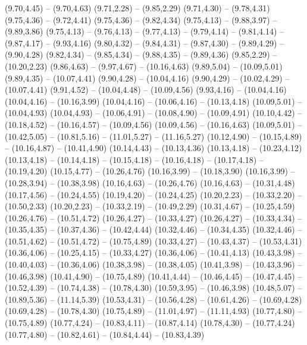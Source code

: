 {  (9.70,4.45) -- (9.70,4.63)
  (9.71,2.28) -- (9.85,2.29)
  (9.71,4.30) -- (9.78,4.31)
  (9.75,4.36) -- (9.72,4.41)
  (9.75,4.36) -- (9.82,4.34)
  (9.75,4.13) -- (9.88,3.97) -- (9.89,3.86)
  (9.75,4.13) -- (9.76,4.13) -- (9.77,4.13) -- (9.79,4.14) -- (9.81,4.14) -- (9.87,4.17) -- (9.93,4.16)
  (9.80,4.32) -- (9.84,4.31) -- (9.87,4.30) -- (9.89,4.29) -- (9.90,4.28)
  (9.82,4.34) -- (9.85,4.34) -- (9.88,4.35) -- (9.89,4.36)
  (9.85,2.29) -- (10.20,2.23)
  (9.86,4.63) -- (9.97,4.67) -- (10.16,4.63)
  (9.89,5.04) -- (10.09,5.01)
  (9.89,4.35) -- (10.07,4.41)
  (9.90,4.28) -- (10.04,4.16)
  (9.90,4.29) -- (10.02,4.29) -- (10.07,4.41)
  (9.91,4.52) -- (10.04,4.48) -- (10.09,4.56)
  (9.93,4.16) -- (10.04,4.16)
  (10.04,4.16) -- (10.16,3.99)
  (10.04,4.16) -- (10.06,4.16) -- (10.13,4.18)
  (10.09,5.01) -- (10.04,4.93)
  (10.04,4.93) -- (10.06,4.91) -- (10.08,4.90) -- (10.09,4.91)
  (10.10,4.42) -- (10.18,4.52) -- (10.16,4.57) -- (10.09,4.56)
  (10.09,4.56) -- (10.16,4.63)
  (10.09,5.01) -- (10.42,5.05) -- (10.81,5.16) -- (11.01,5.27) -- (11.16,5.27)
  (10.12,4.90) -- (10.15,4.89) -- (10.16,4.87) -- (10.41,4.90)
  (10.14,4.43) -- (10.13,4.36)
  (10.13,4.18) -- (10.23,4.12)
  (10.13,4.18) -- (10.14,4.18) -- (10.15,4.18) -- (10.16,4.18) -- (10.17,4.18) -- (10.19,4.20)
  (10.15,4.77) -- (10.26,4.76)
  (10.16,3.99) -- (10.18,3.90)
  (10.16,3.99) -- (10.28,3.94) -- (10.38,3.98)
  (10.16,4.63) -- (10.26,4.76)
  (10.16,4.63) -- (10.31,4.48)
  (10.17,4.56) -- (10.24,4.55)
  (10.19,4.20) -- (10.24,4.25)
  (10.20,2.23) -- (10.33,2.20) -- (10.50,2.33)
  (10.20,2.23) -- (10.33,2.19) -- (10.49,2.29)
  (10.31,4.67) -- (10.25,4.59)
  (10.26,4.76) -- (10.51,4.72)
  (10.26,4.27) -- (10.33,4.27)
  (10.26,4.27) -- (10.33,4.34) -- (10.35,4.35) -- (10.37,4.36) -- (10.42,4.44)
  (10.32,4.46) -- (10.34,4.35)
  (10.32,4.46) -- (10.51,4.62) -- (10.51,4.72) -- (10.75,4.89)
  (10.33,4.27) -- (10.43,4.37) -- (10.53,4.31)
  (10.36,4.06) -- (10.25,4.15) -- (10.33,4.27)
  (10.36,4.06) -- (10.41,4.13)
  (10.43,3.98) -- (10.40,4.03) -- (10.36,4.06)
  (10.38,3.98) -- (10.38,4.05)
  (10.41,3.98) -- (10.43,3.96) -- (10.46,3.98)
  (10.41,4.90) -- (10.75,4.89)
  (10.41,4.44) -- (10.46,4.45) -- (10.47,4.45) -- (10.52,4.39) -- (10.74,4.38) -- (10.78,4.30)
  (10.59,3.95) -- (10.46,3.98)
  (10.48,5.07) -- (10.89,5.36) -- (11.14,5.39)
  (10.53,4.31) -- (10.56,4.28) -- (10.61,4.26) -- (10.69,4.28)
  (10.69,4.28) -- (10.78,4.30)
  (10.75,4.89) -- (11.01,4.97) -- (11.11,4.93)
  (10.77,4.80) -- (10.75,4.89)
  (10.77,4.24) -- (10.83,4.11) -- (10.87,4.14)
  (10.78,4.30) -- (10.77,4.24)
  (10.77,4.80) -- (10.82,4.61) -- (10.84,4.44) -- (10.83,4.39)
}
